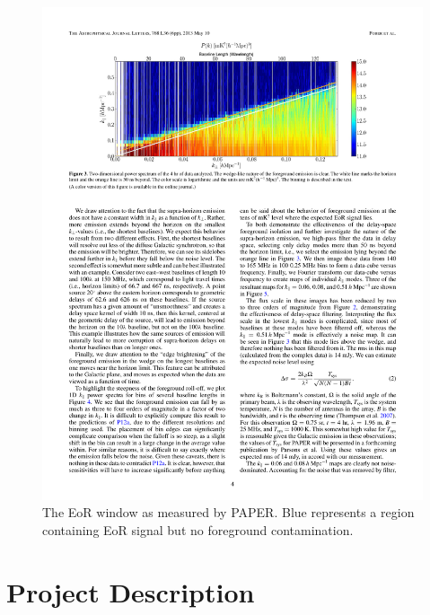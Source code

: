 \documentclass[preprint]{aastex}
\begin{document}
\begin{figure}\centering
\includegraphics{plots/Pober_wedge.pdf}
\caption{\small
The EoR window as measured by PAPER.  Blue represents a region containing EoR signal but no foreground contamination.
}\label{fig:EoRwindow}
\end{figure}




\vspace{-0.25in}
\section{Project Description}
\label{PDsec}
\end{document}
